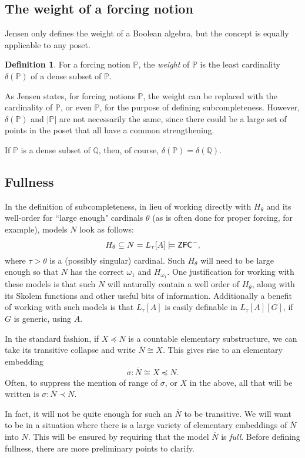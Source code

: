 \documentclass{amsart}
\theoremstyle{definition}
\newtheorem{definition}[theorem]{Definition}
\theoremstyle{remark}
\renewcommand{\P}{\mathbb{P}}
\newcommand{\Q}{\mathbb{Q}}
\newcommand{\N}{{\overline{N}}}
\newcommand{\ZFC}{\textup{\ensuremath{\textsf{ZFC}}}}
\begin{document}
\subsection{The weight of a forcing notion}
\label{subsec:delta}
Jensen only defines the weight of a Boolean algebra, but the concept is equally applicable to any poset.

\begin{definition} For a forcing notion $\P$, the \emph{weight} of \(\P\) is the least cardinality $\delta(\P)$ of a dense subset of $\P$. 
\end{definition}

As Jensen states, for forcing notions $\P$, the weight can be replaced with the cardinality of $\P$, or even $\P$, for the purpose of defining subcompleteness. However, $\delta(\P)$ and $|\P|$ are not necessarily the same, since there could be a large set of points in the poset that all have a common strengthening. 

If $\P$ is a dense subset of $\Q$, then, of course, $\delta(\P) = \delta(\Q)$.




\subsection{Fullness}
\label{subsec:fullness}
In the definition of subcompleteness, in lieu of working directly with $H_\theta$ and its well-order for ``large enough" cardinals $\theta$ (as is often done for proper forcing, for example), models $N$ look as follows: 
	$$H_\theta \subseteq N = L_\tau[A] \models \ZFC^-,$$
where $\tau>\theta$ is a (possibly singular) cardinal. Such $H_\theta$ will need to be large enough so that $N$ has the correct $\omega_1$ and $H_{\omega_1}$. One justification for working with these models is that such $N$ will naturally contain a well order of $H_\theta$, along with its Skolem functions and other useful bits of information. Additionally a benefit of working with such models is that $L_\tau[A]$ is easily definable in $L_\tau[A][G]$, if $G$ is generic, using $A$.

In the standard fashion, if $X \preccurlyeq N$ is a countable elementary substructure, we can take its transitive collapse and write $\N \cong X$. This gives rise to an elementary embedding 
$$\sigma: \N \cong X \preccurlyeq N.$$
Often, to suppress the mention of range of $\sigma$, or $X$ in the above, all that will be written is $\sigma: \N \prec N$.
	
In fact, it will not be quite enough for such an $\N$ to be transitive. We will want to be in a
situation where there is a large variety of elementary embeddings of \(\N\) into \(N\).
This will be ensured by requiring that the model \(\N\) is \emph{full}.
Before defining fullness, there are more preliminary points to clarify.
\end{document}
